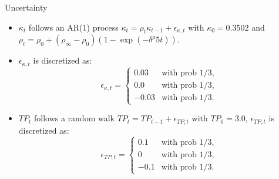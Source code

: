 \documentclass[aspectratio=1610]{beamer}
\begin{document}
\begin{frame}[fragile]{Uncertainty}
\begin{itemize}
    \item $\kappa_t$ follows an AR(1) process $\kappa_t = \rho_t \kappa_{t-1} + \epsilon_{\kappa,t}$ with $\kappa_0 = 0.3502$ and $\rho_t =  \rho_0 + (\rho_\infty - \rho_0) (1-\exp(- \delta^\rho  5t))$. 
   \item $\epsilon_{\kappa,t}$ is discretized as:  
    \begin{equation}
        \epsilon_{\kappa, t} = 
\begin{cases}
0.03 & \text{with prob } 1/3, \\
0.0 & \text{with prob } 1/3, \\
- 0.03 & \text{with prob } 1/3.
\end{cases}
    \end{equation}
    \item $TP_t$ follows a random walk $TP_t = TP_{t-1} + \epsilon_{TP,t}$ with $TP_0 = 3.0$, $\epsilon_{TP,t}$ is discretized as:
    \begin{equation}
        \epsilon_{TP, t} = 
\begin{cases}
0.1 & \text{with prob } 1/3, \\
0 & \text{with prob } 1/3, \\
- 0.1 & \text{with prob } 1/3.
\end{cases}
    \end{equation}
\end{itemize}
\end{frame}
\end{document}
